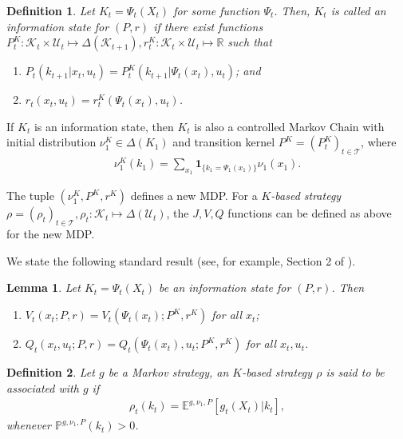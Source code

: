 \documentclass[pdflatex,sn-basic]{sn-jnl}
\newcommand{\E}{\mathbb{E}}
\renewcommand{\Pr}{\mathbb{P}}
\newcommand{\Qfunc}{Q}
\newcommand{\Comp}{K}
\newcommand{\comp}{k}
\newcommand{\Compset}{\mathcal{K}}
\theoremstyle{thmstyleone}%
\newtheorem{lemma}{Lemma}
\theoremstyle{thmstyletwo}%
\theoremstyle{thmstylethree}%
\newtheorem{defn}{Definition}
\begin{document}
\begin{appendices}
\begin{defn}\label{def:app:infostate}
	\citep{mahajan2016decentralized} Let $\Comp_t=\Psi_t(X_t)$ for some function $\Psi_t$. Then, $\Comp_t$ is called an information state for $(P, r)$ if there exist functions $P_t^{\Comp}\colon\Compset_t\times \mathcal{U}_t\mapsto \Delta(\Compset_{t+1}), r_t^{\Comp}\colon\Compset_t\times \mathcal{U}_t\mapsto \mathbb{R}$ such that 
	\begin{enumerate}[(1)]
		\item $P_t(\comp_{t+1}|x_t, u_t) = P_t^{\Comp}(\comp_{t+1}|\Psi_t(x_t), u_t)$; and
		\item $r_t(x_t, u_t) = r_t^{\Comp}(\Psi_t(x_t), u_t)$.
	\end{enumerate}
\end{defn}

If $\Comp_t$ is an information state, then $\Comp_t$ is also a controlled Markov Chain with initial distribution $\nu_1^{\Comp}\in\Delta(\Comp_1)$ and transition kernel $P^{\Comp}=(P_t^{\Comp})_{t\in\mathcal{T}}$, where 
\begin{align*}
	\nu_1^{\Comp}(\comp_1) = \sum_{x_1} \bm{1}_{\{\comp_1 = \Psi_1(x_1) \} } \nu_1(x_1).
\end{align*}

The tuple $(\nu_1^{\Comp}, P^{\Comp}, r^{\Comp})$ defines a new MDP. For a \emph{$\Comp$-based strategy} $\rho=(\rho_t)_{t\in\mathcal{T}}, \rho_t\colon\Compset_t\mapsto \Delta(\mathcal{U}_t)$, the $J, V, \Qfunc$ functions can be defined as above for the new MDP.

We state the following standard result (see, for example, Section 2 of \cite{subramanian2020approximate}).

\begin{lemma}\label{lemma:twoMDPequiv}
	 Let $\Comp_t=\Psi_t(X_t)$ be an information state for $(P, r)$. Then
	\begin{enumerate}[(1)]
		\item $V_t(x_t; P, r) = V_t(\Psi_t(x_t); P^{\Comp}, r^{\Comp})$ for all $x_t$;
		\item $\Qfunc_t(x_t, u_t; P, r) = \Qfunc_t(\Psi_t(x_t), u_t; P^{\Comp}, r^{\Comp})$ for all $x_t, u_t$.
	\end{enumerate}
\end{lemma}

\begin{defn}\label{def:app:association}
	Let $g$ be a Markov strategy, an $K$-based strategy $\rho$ is said to be associated with $g$ if
	\begin{align}\label{rhotheinfostatebasedstrategy}
		\rho_t(\comp_t) = \E^{g, \nu_1, P}[g_t(X_t)|\comp_t],
	\end{align}
	whenever $\Pr^{g, \nu_1, P}(\comp_t) > 0$.
\end{defn}


\end{appendices}
\end{document}
